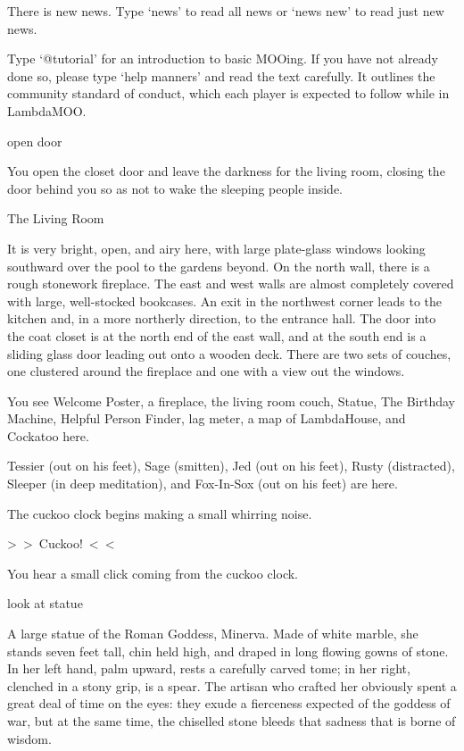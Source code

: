 \documentclass[10pt,twoside,openright]{memoir}
\begin{document}
{There is new news.  Type `news' to read all news or `news new' to read just new news.

Type `@tutorial' for an introduction to basic MOOing.  If you have not already done so, please type `help manners' and read the text carefully.  It outlines the community standard of conduct, which each player is expected to follow while in LambdaMOO.

open door

You open the closet door and leave the darkness for the living room, closing the door behind you so as not to wake the sleeping people inside.

The Living Room

It is very bright, open, and airy here, with large plate-glass windows looking southward over the pool to the gardens beyond.  On the north wall, there is a rough stonework fireplace.  The east and west walls are almost completely covered with large, well-stocked bookcases.  An exit in the northwest corner leads to the kitchen and, in a more northerly direction, to the entrance hall.  The door into the coat closet is at the north end of the east wall, and at the south end is a sliding glass door leading out onto a wooden deck.  There are two sets of couches, one clustered around the fireplace and one with a view out the windows.

You see Welcome Poster, a fireplace, the living room couch, Statue, The Birthday Machine, Helpful Person Finder, lag meter, a map of LambdaHouse, and Cockatoo here.

Tessier (out on his feet), Sage (smitten), Jed (out on his feet), Rusty (distracted), Sleeper (in deep meditation), and Fox-In-Sox (out on his feet) are here.

The cuckoo clock begins making a small whirring noise.

 >~>~Cuckoo!~<~<

You hear a small click coming from the cuckoo clock.

look at statue

A large statue of the Roman Goddess, Minerva. Made of white marble, she stands seven feet tall, chin held high, and draped in long flowing gowns of stone. In her left hand, palm upward, rests a carefully carved tome; in her right, clenched in a stony grip, is a spear.  The artisan who crafted her obviously spent a great deal of time on the eyes: they exude a fierceness expected of the goddess of war, but at the same time, the chiselled stone bleeds that sadness that is borne of wisdom.

}
\end{document}
